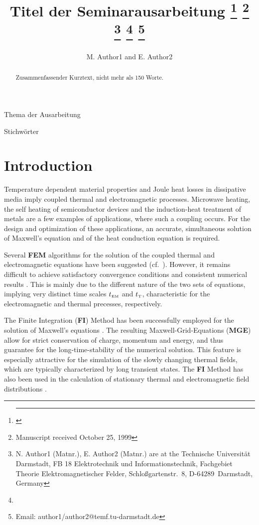 \documentclass[twocolumn]{IEEEtran}
\begin{document}
\title{Titel der Seminarausarbeitung
%
\thanks{\hrule}%
\thanks{Manuscript received October 25, 1999}%
\thanks{N. Author1 (Matnr.), E. Author2 (Matnr.) are
at the Technische Universit\"at Darmstadt, FB 18 Elektrotechnik
und Informationstechnik, Fachgebiet Theorie Elektromagnetischer Felder,
Schlo\ss{}gartenstr.~8, D-64289~Darmstadt, Germany}%
\thanks{}
\thanks{Email: author1/author2@temf.\-tu\--darm\-stadt.\-de}%
}

\author{M. Author1 and E. Author2}

%
{Thema der Ausarbeitung}

\maketitle

\begin{abstract}
Zusammenfassender Kurztext, nicht mehr als 150 Worte.
\end{abstract}

\begin{keywords}
Stichw\"orter
\end{keywords}

\section{Introduction}
Temperature dependent material properties  and Joule heat losses in
dissipative media imply coupled thermal and electromagnetic processes.
Microwave heating, the self heating of semiconductor devices and the
induction-heat treatment of metals are a few examples of applications,
where such a coupling occurs. For the design and optimization of
these applications, an accurate, simultaneous solution of Maxwell's
equation and of the heat conduction equation is required.

Several {\bf FEM} algorithms for the solution of the coupled thermal
and electromagnetic equations have been suggested (cf.~\cite{Hameyer}).
However, it remains difficult to achieve satisfactory convergence
conditions and consistent numerical results \cite{Kost}. This is
mainly due to the different nature of the two sets of equations,
implying very distinct time scales $t_{\rm\scriptscriptstyle EM}$ and $t_{\rm\scriptscriptstyle T}$,
characteristic for the electromagnetic and thermal precesses,
respectively.

The Finite Integration ({\bf FI}) Method has been successfully
employed for the solution of Maxwell's equations \cite{Weiland96e:01}.
The resulting Maxwell-Grid-Equations ({\bf MGE}) allow for strict
conservation of charge, momentum and energy, and thus guarantee for the
long-time-stability of the numerical solution. This feature is especially
attractive for the simulation of the slowly changing thermal fields,
which are typically characterized by long transient states. The
{\bf FI} Method  has also been used in the calculation of stationary
thermal and electromagnetic field distributions
\cite{RienenPinderWeiland96e:01}.
\end{document}
